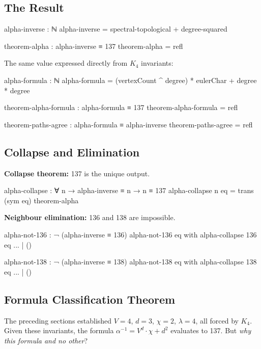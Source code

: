 \documentclass[11pt,a4paper]{article}
\begin{document}
\subsection{The Result}

\begin{code}
alpha-inverse : ℕ
alpha-inverse = spectral-topological + degree-squared

theorem-alpha : alpha-inverse ≡ 137
theorem-alpha = refl
\end{code}

The same value expressed directly from $K_4$ invariants:

\begin{code}
alpha-formula : ℕ
alpha-formula = (vertexCount ^ degree) * eulerChar + degree * degree

theorem-alpha-formula : alpha-formula ≡ 137
theorem-alpha-formula = refl

theorem-paths-agree : alpha-formula ≡ alpha-inverse
theorem-paths-agree = refl
\end{code}

\subsection{Collapse and Elimination}

\textbf{Collapse theorem:} 137 is the unique output.

\begin{code}
alpha-collapse : ∀ n → alpha-inverse ≡ n → n ≡ 137
alpha-collapse n eq = trans (sym eq) theorem-alpha
\end{code}

\textbf{Neighbour elimination:} 136 and 138 are impossible.

\begin{code}
alpha-not-136 : ¬ (alpha-inverse ≡ 136)
alpha-not-136 eq with alpha-collapse 136 eq
... | ()

alpha-not-138 : ¬ (alpha-inverse ≡ 138)
alpha-not-138 eq with alpha-collapse 138 eq
... | ()
\end{code}

\subsection{Formula Classification Theorem}
\label{sec:form-classification}

The preceding sections established $V = 4$, $d = 3$, $\chi = 2$,
$\lambda = 4$, all forced by $K_4$. Given these invariants, the formula
$\alpha^{-1} = V^d \cdot \chi + d^2$ evaluates to 137.
But \emph{why this formula and no other}?
\end{document}
